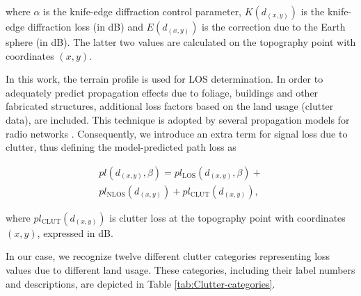\noindent where $\alpha$ is the knife-edge diffraction control parameter,
$K(d_{(x,y)})$ is the knife-edge diffraction loss (in dB) and $E(d_{(x,y)})$
is the correction due to the Earth sphere (in dB). The latter two
values are calculated on the topography point with coordinates $(x,y)$.

In this work, the terrain profile is used for LOS determination. In
order to adequately predict propagation effects due to foliage, buildings
and other fabricated structures, additional loss factors based on
the land usage (clutter data), are included. This technique is adopted
by several propagation models for radio networks \cite{Aarnaes-Tuning_of_empirical_radio_propagation_models_effect_of_location_accuracy:2004,Begovic_Applicability_evaluation_of_Okumura_Ericsson_and_Winner_propagation_models_for_coverage_planning:2012,Neskovic_Microcell_electric_field_strength_prediction_model:2010}.
Consequently, we introduce an extra term for signal loss due to clutter,
thus defining the model-predicted path loss as

\begin{multline}
pl(d_{(x,y)},\beta)=pl_{\mathrm{LOS}}(d_{(x,y)},\beta)+\\
pl_{\mathrm{NLOS}}(d_{(x,y)})+pl_{\mathrm{CLUT}}(d_{(x,y)}),\label{eq:eric_pathloss}
\end{multline}


\noindent where $pl_{\mathrm{CLUT}}(d_{(x,y)})$ is clutter loss at
the topography point with coordinates $(x,y)$, expressed in dB.

In our case, we recognize twelve different clutter categories representing
loss values due to different land usage. These categories, including
their label numbers and descriptions, are depicted in Table \ref{tab:Clutter-categories}.

